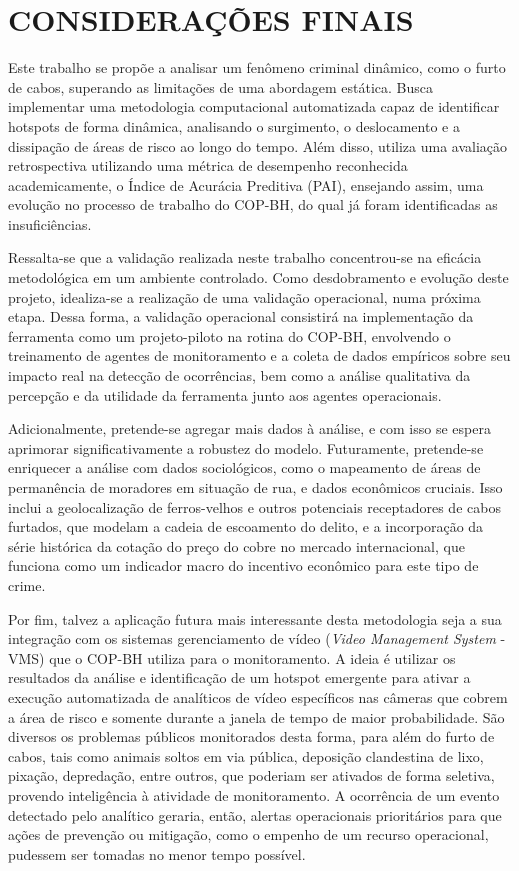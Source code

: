 \section{CONSIDERAÇÕES FINAIS} %
\label{sec:conclusao}
Este trabalho se propõe a  analisar um fenômeno criminal dinâmico, como o furto de cabos, superando as limitações de uma abordagem estática. Busca implementar uma metodologia computacional automatizada capaz de identificar hotspots de forma dinâmica, analisando o surgimento, o deslocamento e a dissipação de áreas de risco ao longo do tempo. Além disso, utiliza uma avaliação retrospectiva utilizando uma métrica de desempenho reconhecida academicamente, o Índice de Acurácia Preditiva (PAI), ensejando assim, uma evolução no processo de trabalho do COP-BH, do qual já foram identificadas as insuficiências.

Ressalta-se que a validação realizada neste trabalho concentrou-se na eficácia metodológica em um ambiente controlado. Como desdobramento e evolução deste projeto, idealiza-se a realização de uma validação operacional, numa próxima etapa. Dessa forma, a validação operacional consistirá na implementação da ferramenta como um projeto-piloto na rotina do COP-BH, envolvendo o treinamento de agentes de monitoramento e a coleta de dados empíricos sobre seu impacto real na detecção de ocorrências, bem como a análise qualitativa da percepção e da utilidade da ferramenta junto aos agentes operacionais.

Adicionalmente, pretende-se agregar mais dados à análise, e com isso se espera aprimorar significativamente a robustez do modelo. Futuramente, pretende-se enriquecer a análise com dados sociológicos, como o mapeamento de áreas de permanência de moradores em situação de rua, e dados econômicos cruciais. Isso inclui a geolocalização de ferros-velhos e outros potenciais receptadores de cabos furtados, que modelam a cadeia de escoamento do delito, e a incorporação da série histórica da cotação do preço do cobre no mercado internacional, que funciona como um indicador macro do incentivo econômico para este tipo de crime.

Por fim, talvez a aplicação futura mais interessante desta metodologia seja a sua integração com os sistemas gerenciamento de vídeo (\textit{Video Management System} - VMS) que o COP-BH utiliza para o monitoramento. A ideia é utilizar os resultados da análise e identificação de um hotspot emergente para ativar a execução automatizada de analíticos de vídeo específicos nas câmeras que cobrem a área de risco e somente durante a janela de tempo de maior probabilidade. São diversos os problemas públicos monitorados desta forma, para além do furto de cabos, tais como animais soltos em via pública, deposição clandestina de lixo, pixação, depredação, entre outros, que poderiam ser ativados de forma seletiva, provendo inteligência à atividade de monitoramento. A ocorrência de um evento detectado pelo analítico geraria, então, alertas operacionais prioritários para que ações de prevenção ou mitigação, como o empenho de um recurso operacional, pudessem ser tomadas no menor tempo possível.

